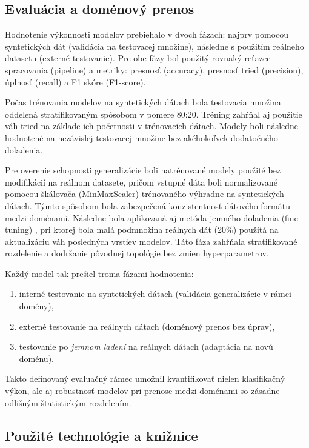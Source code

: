 \documentclass[a4paper,10pt]{ieeetran}
\begin{document}
\subsection{Evaluácia a doménový prenos}
\label{subsec3}

Hodnotenie výkonnosti modelov prebiehalo v dvoch fázach: najprv pomocou syntetických dát (validácia na testovacej množine), následne s použitím reálneho datasetu (externé testovanie). Pre obe fázy bol použitý rovnaký reťazec spracovania (pipeline) a metriky: presnosť (accuracy), presnosť tried (precision), úplnosť (recall) a F1 skóre (F1-score).

Počas trénovania modelov na syntetických dátach bola testovacia množina oddelená stratifikovaným spôsobom v pomere 80:20. Tréning zahŕňal aj použitie váh tried na základe ich početnosti v trénovacích dátach. Modely boli následne hodnotené na nezávislej testovacej množine bez akéhokoľvek dodatočného doladenia.

Pre overenie schopnosti generalizácie boli natrénované modely použité bez modifikácií na reálnom datasete, pričom vstupné dáta boli normalizované pomocou škálovača (MinMaxScaler) trénovaného výhradne na syntetických dátach. Týmto spôsobom bola zabezpečená konzistentnosť dátového formátu medzi doménami. Následne bola aplikovaná aj metóda jemného doladenia (fine-tuning) \cite{selfadapting}, pri ktorej bola malá podmnožina reálnych dát (20\%) použitá na aktualizáciu váh posledných vrstiev modelov. Táto fáza zahŕňala stratifikované rozdelenie a dodržanie pôvodnej topológie bez zmien hyperparametrov.

Každý model tak prešiel troma fázami hodnotenia:
\begin{enumerate}
    \item interné testovanie na syntetických dátach (validácia generalizácie v rámci domény),
    \item externé testovanie na reálnych dátach (doménový prenos bez úprav),
    \item testovanie po \textit{jemnom ladení} na reálnych dátach (adaptácia na novú doménu).
\end{enumerate}

Takto definovaný evaluačný rámec umožnil kvantifikovať nielen klasifikačný výkon, ale aj robustnosť modelov pri prenose medzi doménami so zásadne odlišným štatistickým rozdelením.

\subsection{Použité technológie a knižnice}
\label{subsec_tech}
\end{document}
